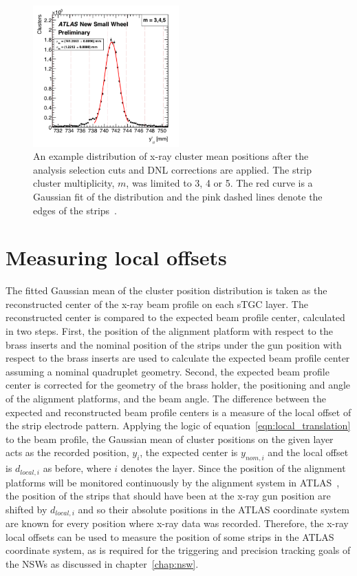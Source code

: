 \begin{figure}[t]
    \centering
    \includegraphics[width = 0.5\textwidth]{figures/figure_xray_beam_profile.pdf}
    \caption{An example distribution of x-ray cluster mean positions after the analysis selection cuts and DNL corrections are applied. The strip cluster multiplicity, $m$, was limited to 3, 4 or 5. The red curve is a Gaussian fit of the distribution and the pink dashed lines denote the edges of the strips~\cite{lefebvre_precision_2020}.}
    \label{fig:xray_beam_profile}
\end{figure}

\section{Measuring local offsets}
The fitted Gaussian mean of the cluster position distribution is taken as the reconstructed center of the x-ray beam profile on each sTGC layer. The reconstructed center is compared to the expected beam profile center, calculated in two steps. First, the position of the alignment platform with respect to the brass inserts and the nominal position of the strips under the gun position with respect to the brass inserts are used to calculate the expected beam profile center assuming a nominal quadruplet geometry. Second, the expected beam profile center is corrected for the geometry of the brass holder, the positioning and angle of the alignment platforms, and the beam angle. The difference between the expected and reconstructed beam profile centers is a measure of the local offset of the strip electrode pattern. Applying the logic of equation~\ref{eqn:local_translation} to the beam profile, the Gaussian mean of cluster positions on the given layer acts as the recorded position, $y_i$, the expected center is $y_{nom, i}$ and the local offset is $d_{local, i}$ as before, where $i$ denotes the layer. Since the position of the alignment platforms will be monitored continuously by the alignment system in ATLAS~\cite{nsw_tdr}, the position of the strips that should have been at the x-ray gun position are shifted by $d_{local, i}$ and so their absolute positions in the ATLAS coordinate system are known for every position where x-ray data was recorded. Therefore, the x-ray local offsets can be used to measure the position of some strips in the ATLAS coordinate system, as is required for the triggering and precision tracking goals of the NSWs as discussed in chapter~\ref{chap:nsw}.

